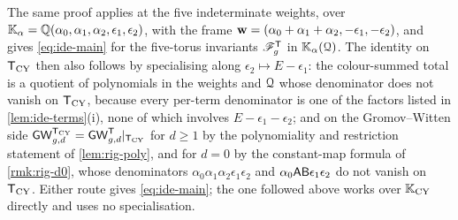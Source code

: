 \begin{rmk}
\label{rmk:ide-alt}
The same proof applies at the five indeterminate weights, over $\mathbb{K}_{\alpha}=\mathbb{Q}(\alpha_0,\alpha_1,\alpha_2,\epsilon_1,\epsilon_2)$, with the frame $\mathbf{w}=(\alpha_0+\alpha_1+\alpha_2,-\epsilon_1,-\epsilon_2)$, and gives \cref{eq:ide-main} for the five-torus invariants $\mathscr{F}_g^{\mathsf{T}}$ in $\mathbb{K}_{\alpha}(\mathcal{Q})$. The identity on $\mathsf{T}_{\mathrm{CY}}$ then also follows by specialising along $\epsilon_2\mapsto E-\epsilon_1$: the colour-summed total is a quotient of polynomials in the weights and $\mathcal{Q}$ whose denominator does not vanish on $\mathsf{T}_{\mathrm{CY}}$, because every per-term denominator is one of the factors listed in \cref{lem:ide-terms}(i), none of which involves $E-\epsilon_1-\epsilon_2$; and on the Gromov--Witten side $\mathsf{GW}^{\mathsf{T}_{\mathrm{CY}}}_{g,d}=\mathsf{GW}^{\mathsf{T}}_{g,d}|_{\mathsf{T}_{\mathrm{CY}}}$ for $d\geq 1$ by the polynomiality and restriction statement of \cref{lem:rig-poly}, and for $d=0$ by the constant-map formula of \cref{rmk:rig-d0}, whose denominators $\alpha_0\alpha_1\alpha_2\epsilon_1\epsilon_2$ and $\alpha_0\mathsf{A}\mathsf{B}\epsilon_1\epsilon_2$ do not vanish on $\mathsf{T}_{\mathrm{CY}}$. Either route gives \cref{eq:ide-main}; the one followed above works over $\mathbb{K}_{\mathrm{CY}}$ directly and uses no specialisation.
\end{rmk}

